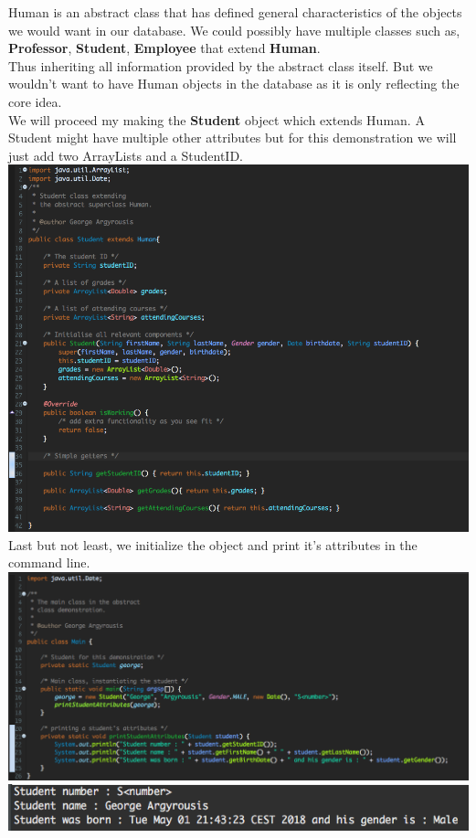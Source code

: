 \documentclass{article}
\begin{document}
Human is an abstract class that has defined general characteristics of the objects we would want in our database. We could possibly have multiple classes such as, \textbf{Professor}, \textbf{Student}, \textbf{Employee} that extend \textbf{Human}.\\
Thus inheriting all information provided by the abstract class itself. But we wouldn't want to have Human objects in the database as it is only reflecting the core idea.\\
We will proceed my making the \textbf{Student} object which extends Human.
A Student might have multiple other attributes but for this demonstration we will just add two ArrayLists and a StudentID.\\
\includegraphics[scale=0.45]{images/Student_Step2.png}\\
Last but not least, we initialize the object and print it's attributes in the
command line.\\
\includegraphics[scale=0.40]{images/Main_without_error.png}\\
\includegraphics[scale=0.71]{images/output.png}\\
\end{document}
